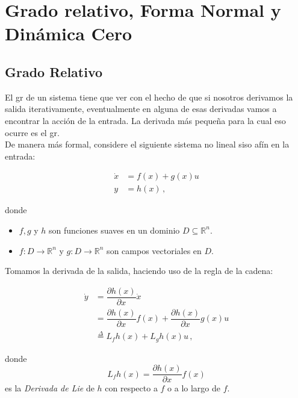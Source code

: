 \chapter{Grado relativo, Forma Normal y Dinámica Cero}

\section{Grado Relativo}

El \gls{gr} de un sistema tiene que ver con el hecho de que si nosotros derivamos la salida iterativamente, eventualmente en alguna de esas derivadas vamos a encontrar la acción de la entrada. La derivada más pequeña para la cual eso ocurre es el \gls{gr}.\\

De manera más formal, considere el siguiente sistema no lineal \gls{siso} afín en la entrada:

\begin{equation}
	\begin{aligned}
		\dot{x} & = f(x) + g(x)u \\
		y       & = h(x) \, ,
	\end{aligned}
	\label{eq:siso_afin}
\end{equation}

donde
\begin{itemize}
	\item $f, g$ y $h$ son funciones suaves en un dominio $D \subseteq \mathbb{R}^n$.
	\item $f: D \rightarrow \mathbb{R}^n$ y $g: D \rightarrow \mathbb{R}^{n}$ son campos vectoriales en $D$.
\end{itemize}

Tomamos la derivada de la salida, haciendo uso de la regla de la cadena:

\begin{equation*}
	\begin{aligned}
		\dot{y} & = \dfrac{\partial h(x)}{\partial x} \dot{x}                                        \\
		        & = \dfrac{\partial h(x)}{\partial x} f(x) + \dfrac{\partial h(x)}{\partial x} g(x)u \\
		        & \overset{\Delta}{=} L_fh(x) + L_gh(x)u \, ,
	\end{aligned}
\end{equation*}

donde
\begin{equation*}
	L_fh(x) = \dfrac{\partial h(x)}{\partial x} f(x)
\end{equation*}
es la \textit{Derivada de Lie} de $h$ con respecto a $f$ o a lo largo de $f$.\\


